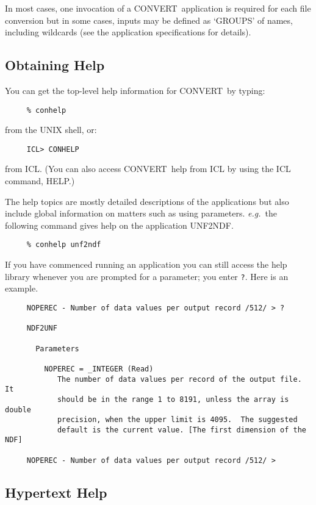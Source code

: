 \documentclass[twoside,11pt]{article}
\newcommand{\htmlref}[2]{#1}
\newcommand{\xref}[3]{#1}
\newcommand{\xlabel}[1]{}
\newcommand{\CONVERT}{{\footnotesize CONVERT}}
\begin{document}
In most cases, one invocation of a \CONVERT\ application is required for each 
file conversion but in some cases, inputs may be defined as 
\xref{`GROUPS'}{sun150}{} of names, including wildcards (see the 
\htmlref{application specifications}{app_full} for details).

\subsection{\xlabel{obtaining_help}Obtaining Help}
You can get the top-level help information for \CONVERT\  by typing:

\small
\begin{verbatim}
     % conhelp
\end{verbatim}
\normalsize
from the UNIX shell, or:
\small
\begin{verbatim}
     ICL> CONHELP
\end{verbatim}
\normalsize
from ICL. (You can also access \CONVERT\ help from ICL by using the ICL command,
HELP.)

The help topics are mostly detailed descriptions of the applications
but also include global information on matters such as using parameters. 
{\em{e.g.}}\ the following command gives help on the application
\htmlref{UNF2NDF}{UNF2NDF}.

\small
\begin{verbatim}
     % conhelp unf2ndf
\end{verbatim}
\normalsize

If you have commenced running an application you can still access the
help library whenever you are prompted for a parameter; you enter \texttt{?}.
Here is an example.

\small
\begin{verbatim}
     NOPEREC - Number of data values per output record /512/ > ?

     NDF2UNF

       Parameters

         NOPEREC = _INTEGER (Read)
            The number of data values per record of the output file.  It
            should be in the range 1 to 8191, unless the array is double
            precision, when the upper limit is 4095.  The suggested
            default is the current value. [The first dimension of the NDF]

     NOPEREC - Number of data values per output record /512/ > 
\end{verbatim}
\normalsize

\subsection{\xlabel{sun55_se_hypertext}Hypertext Help\label{se_hypertext}}
\end{document}

